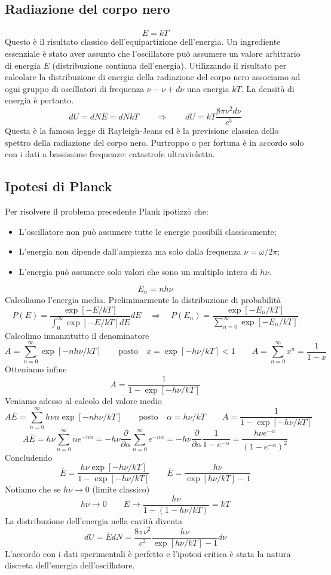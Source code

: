 \subsection{Radiazione del corpo nero}
$$
\overline{E}=kT
$$
Questo è il risultato classico dell'equipartizione dell'energia. Un ingrediente essenziale è stato aver assunto che l'oscillatore può assumere un valore arbitrario di energia $E$ (distribuzione continua dell'energia). Utilizzando il risultato per calcolare la distribuzione di energia della radiazione del corpo nero associamo ad ogni gruppo di oscillatori di frequenza $\nu-\nu+d\nu$ una energia $kT$. La densità di energia è pertanto.
$$
dU=dN\overline{E}=dNkT \qquad \Rightarrow \qquad dU=kT\frac{8\pi\nu^2d\nu}{c^3}
$$
Questa è la famosa legge di Rayleigh-Jeans ed è la previsione classica dello spettro della radiazione del corpo nero. Purtroppo o per fortuna è in accordo solo con i dati a bassissime frequenze: catastrofe ultravioletta.
\subsection{Ipotesi di Planck}
Per risolvere il problema precedente Plank ipotizzò che:
\begin{itemize}
    \item L'oscillatore non può assumere tutte le energie possibili classicamente;
    \item L'energia non dipende dall'ampiezza ma solo dalla frequenza $\nu=\omega/2\pi$;
    \item L'energia può assumere solo valori che sono un multiplo intero di $h\nu$.
\end{itemize}
$$
E_n=nh\nu
$$
Calcoliamo l'energia media. Preliminarmente la distribuzione di probabilità
$$
P(E) = \frac{\exp[-E/kT]}{\int_0^\infty \exp[-E/kT] dE} dE \quad \Rightarrow\quad P(E_n) = \frac{\exp[-E_n / kT]}{\sum_{n=0}^\infty \exp[-E_n / kT]}
$$
Calcolimo innanzitutto il denominatore
$$
A = \sum_{n=0}^\infty \exp[-nh\nu / kT] \qquad \text{posto} \quad x = \exp[-h\nu / kT] < 1 \qquad A = \sum_{n=0}^\infty x^n = \frac{1}{1-x}
$$
Otteniamo infine
$$
A = \frac{1}{1 - \exp[-h\nu / kT]}
$$
Veniamo adesso al calcolo del valore medio
$$
A \overline{E} = \sum_{n=0}^\infty h\nu n \exp[-nh\nu / kT] \qquad \text{posto} \quad \alpha = h\nu / kT \qquad A = \frac{1}{1 - \exp[-h\nu / kT]}
$$
$$
A \overline{E} = h\nu \sum_{n=0}^\infty n e^{-n\alpha} = -h\nu \frac{\partial}{\partial \alpha} \sum_{n=0}^\infty e^{-n\alpha} = -h\nu \frac{\partial}{\partial \alpha} \frac{1}{1 - e^{-\alpha}} = \frac{h\nu e^{-\alpha}}{(1 - e^{-\alpha})^2}
$$
Concludendo
$$
\overline{E} = \frac{h\nu \exp[-h\nu / kT]}{1 - \exp[-h\nu / kT]} \qquad \overline{E} = \frac{h\nu}{\exp[h\nu / kT] - 1}
$$
Notiamo che se $h\nu\to0$ (limite classico)
$$
h\nu \to 0 \qquad \overline{E} \to \frac{h\nu}{1 - (1 - h\nu / kT)} = kT
$$
La distribuzione dell'energia nella cavità diventa
$$
dU = \overline{E} dN = \frac{8\pi\nu^2}{c^3} \frac{h\nu}{\exp[h\nu / kT] - 1} d\nu
$$
L'accordo con i dati sperimentali è perfetto e l'ipotesi critica è stata la natura discreta dell'energia dell'oscillatore.
